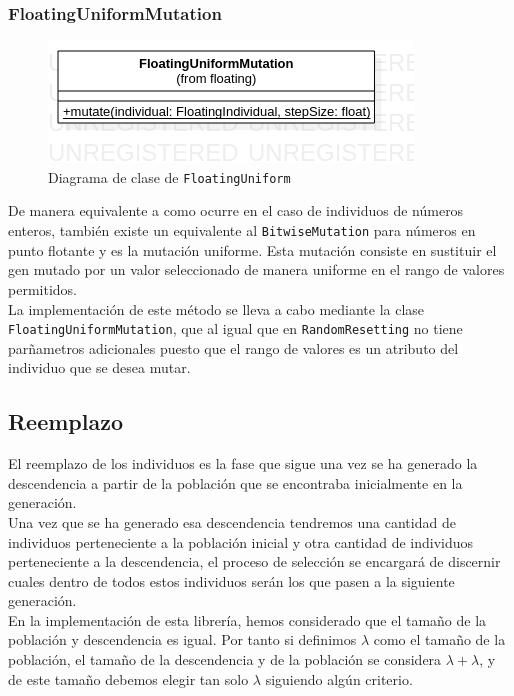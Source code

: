 \subsubsection{FloatingUniformMutation}

\begin{figure}[ht]
    \centering
    \includegraphics[scale=0.4]{mem/images/cap-4/4.2.7(Mutation)/FloatingUniformMutation.png}
    \caption{Diagrama de clase de \texttt{FloatingUniform}}
    \label{fig:my_label}
\end{figure}

De manera equivalente a como ocurre en el caso de individuos de números enteros, también existe un equivalente al \texttt{BitwiseMutation} para números en punto flotante y es la mutación uniforme. Esta mutación consiste en sustituir el gen mutado por un valor seleccionado de manera uniforme en el rango de valores permitidos. \\

La implementación de este método se lleva a cabo mediante la clase \texttt{FloatingUniformMutation}, que al igual que en \texttt{RandomResetting} no tiene parñametros adicionales puesto que el rango de valores es un atributo del individuo que se desea mutar.

\subsection{Reemplazo}

El reemplazo de los individuos es la fase que sigue una vez se ha generado la descendencia a partir de la población que se encontraba inicialmente en la generación. \\

Una vez que se ha generado esa descendencia tendremos una cantidad de individuos perteneciente a la población inicial y otra cantidad de individuos perteneciente a la descendencia, el proceso de selección se encargará de discernir cuales dentro de todos estos individuos serán los que pasen a la siguiente generación. \\

En la implementación de esta librería, hemos considerado que el tamaño de la población y descendencia es igual. Por tanto si definimos $\lambda$ como el tamaño de la población, el tamaño de la descendencia y de la población se considera $\lambda + \lambda$, y de este tamaño debemos elegir tan solo $\lambda$ siguiendo algún criterio.

